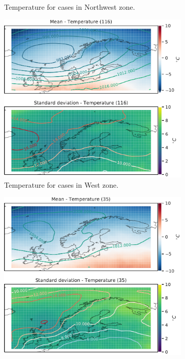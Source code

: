 \begin{figure}[H]
\begin{subfigure}[b]{0.49\textwidth}
    \caption{Temperature for cases in Northwest zone.}
    \label{fig:NordWestTemperature}
\end{subfigure}
\begin{subfigure}[b]{0.49\textwidth}
    \centering
    \includegraphics[width=\textwidth]{Figures/TempVest.pdf}
    \caption{Temperature for cases in West zone.}
    \label{fig:WestTemperature}
\end{subfigure}
\begin{subfigure}[b]{0.49\textwidth}
    \centering
    \includegraphics[width=\textwidth]{Figures/TempSor.pdf}

\end{subfigure}
\end{figure}
